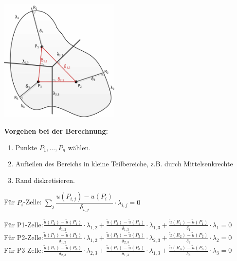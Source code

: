 \begin{minipage}{6cm}
	\includegraphics[width=6cm]{Content/02_numerics/FVM1.png}
\end{minipage}
\hfill
\begin{minipage}{12cm}
\textbf{Vorgehen bei der Berechnung:}\\
\begin{enumerate}
\item Punkte $P_1,\ldots,P_n$ wählen.
\item Aufteilen des Bereichs in kleine Teilbereiche, z.B. durch Mittelsenkrechte
\item Rand diskretisieren.\\
\end{enumerate}

Für $P_i$-Zelle: $\sum\limits_{j} \dfrac{u(P_{i,j}) - u(P_i)}{\delta_{i,j}} \cdot \lambda_{i,j} = 0$

Für P1-Zelle:\quad $\frac{\tilde{u}(P_2)-\tilde{u}(P_1)}{\delta_{1,2}}\cdot\lambda_{1,2}+\frac{\tilde{u}(P_3)-\tilde{u}(P_1)}{\delta_{1,3}}\cdot\lambda_{1,3}+\frac{\tilde{u}(R_1)-\tilde{u}(P_1)}{\delta_1}\cdot\lambda_1=0$\\

Für P2-Zelle:\quad $\frac{\tilde{u}(P_1)-\tilde{u}(P_2)}{\delta_{1,2}}\cdot\lambda_{1,2}+\frac{\tilde{u}(P_3)-\tilde{u}(P_2)}{\delta_{2,3}}\cdot\lambda_{2,3}+\frac{\tilde{u}(R_2)-\tilde{u}(P_2)}{\delta_2}\cdot\lambda_2=0$\\

Für P3-Zelle:\quad $\frac{\tilde{u}(P_2)-\tilde{u}(P_3)}{\delta_{2,3}}\cdot\lambda_{2,3}+\frac{\tilde{u}(P_1)-\tilde{u}(P_3)}{\delta_{1,3}}\cdot\lambda_{1,3}+\frac{\tilde{u}(R_3)-\tilde{u}(P_3)}{\delta_3}\cdot\lambda_3=0$\\
\end{minipage}

